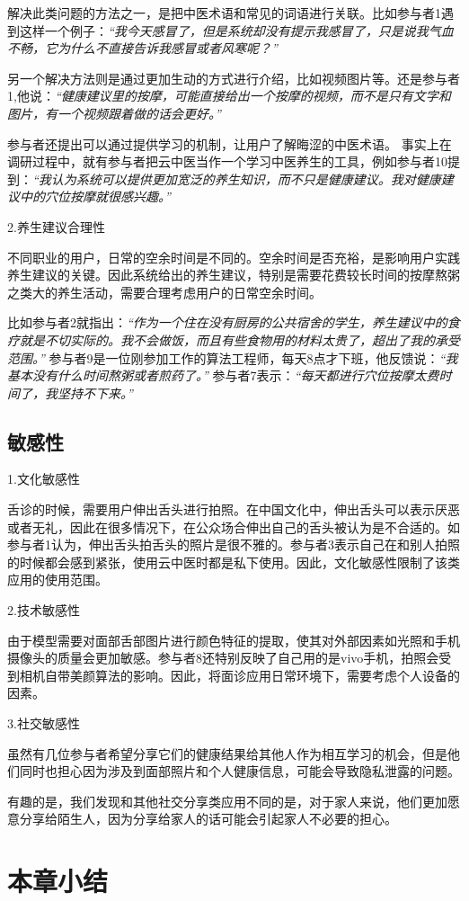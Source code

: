 解决此类问题的方法之一，是把中医术语和常见的词语进行关联。比如参与者1遇到这样一个例子：\textit{“我今天感冒了，但是系统却没有提示我感冒了，只是说我气血不畅，它为什么不直接告诉我感冒或者风寒呢？”}

另一个解决方法则是通过更加生动的方式进行介绍，比如视频图片等。还是参与者1,他说：\textit{“健康建议里的按摩，可能直接给出一个按摩的视频，而不是只有文字和图片，有一个视频跟着做的话会更好。”}

参与者还提出可以通过提供学习的机制，让用户了解晦涩的中医术语。
事实上在调研过程中，就有参与者把云中医当作一个学习中医养生的工具，例如参与者10提到：\textit{“我认为系统可以提供更加宽泛的养生知识，而不只是健康建议。我对健康建议中的穴位按摩就很感兴趣。”}

2.养生建议合理性

不同职业的用户，日常的空余时间是不同的。空余时间是否充裕，是影响用户实践养生建议的关键。因此系统给出的养生建议，特别是需要花费较长时间的按摩熬粥之类大的养生活动，需要合理考虑用户的日常空余时间。

比如参与者2就指出：\textit{“作为一个住在没有厨房的公共宿舍的学生，养生建议中的食疗就是不切实际的。我不会做饭，而且有些食物用的材料太贵了，超出了我的承受范围。”}
参与者9是一位刚参加工作的算法工程师，每天8点才下班，他反馈说：\textit{“我基本没有什么时间熬粥或者煎药了。”} 参与者7表示：\textit{“每天都进行穴位按摩太费时间了，我坚持不下来。”}

\subsection{敏感性}
1.文化敏感性

舌诊的时候，需要用户伸出舌头进行拍照。在中国文化中，伸出舌头可以表示厌恶或者无礼，因此在很多情况下，在公众场合伸出自己的舌头被认为是不合适的。如参与者1认为，伸出舌头拍舌头的照片是很不雅的。参与者3表示自己在和别人拍照的时候都会感到紧张，使用云中医时都是私下使用。因此，文化敏感性限制了该类应用的使用范围。

2.技术敏感性

由于模型需要对面部舌部图片进行颜色特征的提取，使其对外部因素如光照和手机摄像头的质量会更加敏感。参与者8还特别反映了自己用的是vivo手机，拍照会受到相机自带美颜算法的影响。因此，将面诊应用日常环境下，需要考虑个人设备的因素。

3.社交敏感性

虽然有几位参与者希望分享它们的健康结果给其他人作为相互学习的机会，但是他们同时也担心因为涉及到面部照片和个人健康信息，可能会导致隐私泄露的问题。


有趣的是，我们发现和其他社交分享类应用不同的是，对于家人来说，他们更加愿意分享给陌生人，因为分享给家人的话可能会引起家人不必要的担心。


\section{本章小结}

